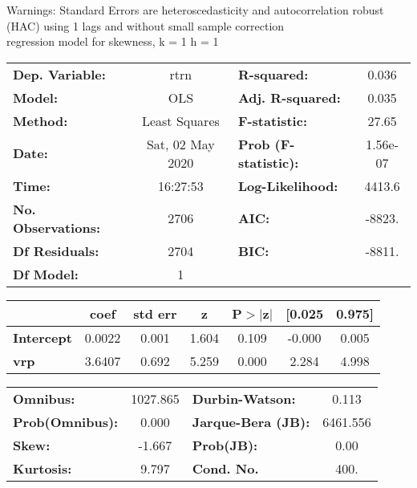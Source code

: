 Warnings: \newline
 [1] Standard Errors are heteroscedasticity and autocorrelation robust (HAC) using 1 lags and without small sample correction\\ 

regression model for skewness, k = 1 h = 1\begin{center}
\begin{tabular}{lclc}
\toprule
\textbf{Dep. Variable:}    &       rtrn       & \textbf{  R-squared:         } &     0.036   \\
\textbf{Model:}            &       OLS        & \textbf{  Adj. R-squared:    } &     0.035   \\
\textbf{Method:}           &  Least Squares   & \textbf{  F-statistic:       } &     27.65   \\
\textbf{Date:}             & Sat, 02 May 2020 & \textbf{  Prob (F-statistic):} &  1.56e-07   \\
\textbf{Time:}             &     16:27:53     & \textbf{  Log-Likelihood:    } &    4413.6   \\
\textbf{No. Observations:} &        2706      & \textbf{  AIC:               } &    -8823.   \\
\textbf{Df Residuals:}     &        2704      & \textbf{  BIC:               } &    -8811.   \\
\textbf{Df Model:}         &           1      & \textbf{                     } &             \\
\bottomrule
\end{tabular}
\begin{tabular}{lcccccc}
                   & \textbf{coef} & \textbf{std err} & \textbf{z} & \textbf{P$> |$z$|$} & \textbf{[0.025} & \textbf{0.975]}  \\
\midrule
\textbf{Intercept} &       0.0022  &        0.001     &     1.604  &         0.109        &       -0.000    &        0.005     \\
\textbf{vrp}       &       3.6407  &        0.692     &     5.259  &         0.000        &        2.284    &        4.998     \\
\bottomrule
\end{tabular}
\begin{tabular}{lclc}
\textbf{Omnibus:}       & 1027.865 & \textbf{  Durbin-Watson:     } &    0.113  \\
\textbf{Prob(Omnibus):} &   0.000  & \textbf{  Jarque-Bera (JB):  } & 6461.556  \\
\textbf{Skew:}          &  -1.667  & \textbf{  Prob(JB):          } &     0.00  \\
\textbf{Kurtosis:}      &   9.797  & \textbf{  Cond. No.          } &     400.  \\
\bottomrule
\end{tabular}
\end{center}

